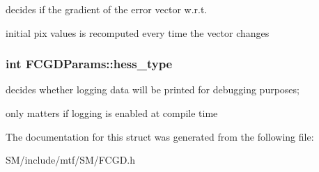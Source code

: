 decides if the gradient of the error vector w.\-r.\-t. 

initial pix values is recomputed every time the vector changes \hypertarget{structFCGDParams_a1ad5227e27a72d4d7edda8d68ba559e8}{
\subsubsection[{hess\-\_\-type}]{\setlength{\rightskip}{0pt plus 5cm}int F\-C\-G\-D\-Params\-::hess\-\_\-type}}\label{structFCGDParams_a1ad5227e27a72d4d7edda8d68ba559e8}


decides whether logging data will be printed for debugging purposes; 

only matters if logging is enabled at compile time 

The documentation for this struct was generated from the following file\-:\begin{DoxyCompactItemize}
\item 
S\-M/include/mtf/\-S\-M/F\-C\-G\-D.\-h\end{DoxyCompactItemize}
